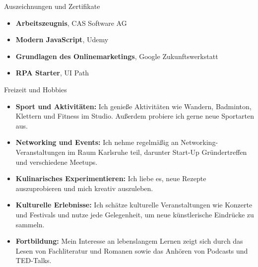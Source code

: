 \documentclass{resume} %
\begin{document}
\begin{rSection}{Auszeichnungen und Zertifikate}
    \begin{itemize}
        \item \textbf{Arbeitszeugnis}, CAS Software AG
        \item \textbf{Modern JavaScript}, Udemy
        \item \textbf{Grundlagen des Onlinemarketings}, Google Zukunftswerkstatt
        \item \textbf{RPA Starter}, UI Path
    \end{itemize}


\end{rSection}

\begin{rSection}{Freizeit und Hobbies}
    \begin{itemize}
        \item \raggedright{\textbf{Sport und Aktivitäten:} Ich genieße Aktivitäten wie Wandern, Badminton, Klettern und Fitness im Studio. Außerdem probiere ich gerne neue Sportarten aus.}
        \item \raggedright{\textbf{Networking und Events:} Ich nehme regelmäßig an Networking-Veranstaltungen im Raum Karlsruhe teil, darunter Start-Up Gründertreffen und verschiedene Meetups.}
        \item \raggedright{\textbf{Kulinarisches Experimentieren:} Ich liebe es, neue Rezepte auszuprobieren und mich kreativ auszuleben.} 
        \item \raggedright{\textbf{Kulturelle Erlebnisse:} Ich schätze kulturelle Veranstaltungen wie Konzerte und Festivals und nutze jede Gelegenheit, um neue künstlerische Eindrücke zu sammeln.}
        \item \raggedright{\textbf{Fortbildung:} Mein Interesse an lebenslangem Lernen zeigt sich durch das Lesen von Fachliteratur und Romanen sowie das Anhören von Podcasts und TED-Talks.}
    \end{itemize}


\end{rSection}
\end{document}
